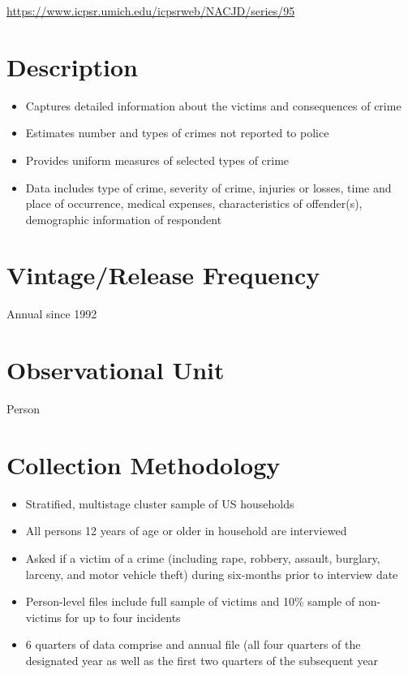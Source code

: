 \documentclass[
]{book}
\providecommand{\tightlist}{%
  \setlength{\itemsep}{0pt}\setlength{\parskip}{0pt}}
\begin{document}
\url{https://www.icpsr.umich.edu/icpsrweb/NACJD/series/95}

\hypertarget{description-46}{%
\section{Description}\label{description-46}}

\begin{itemize}
\tightlist
\item
  Captures detailed information about the victims and consequences of crime
\item
  Estimates number and types of crimes not reported to police
\item
  Provides uniform measures of selected types of crime
\item
  Data includes type of crime, severity of crime, injuries or losses, time and place of occurrence, medical expenses, characteristics of offender(s), demographic information of respondent
\end{itemize}

\hypertarget{vintagerelease-frequency-46}{%
\section{Vintage/Release Frequency}\label{vintagerelease-frequency-46}}

Annual since 1992

\hypertarget{observational-unit-46}{%
\section{Observational Unit}\label{observational-unit-46}}

Person

\hypertarget{collection-methodology-46}{%
\section{Collection Methodology}\label{collection-methodology-46}}

\begin{itemize}
\tightlist
\item
  Stratified, multistage cluster sample of US households
\item
  All persons 12 years of age or older in household are interviewed
\item
  Asked if a victim of a crime (including rape, robbery, assault, burglary, larceny, and motor vehicle theft) during six-months prior to interview date
\item
  Person-level files include full sample of victims and 10\% sample of non-victims for up to four incidents
\item
  6 quarters of data comprise and annual file (all four quarters of the designated year as well as the first two quarters of the subsequent year
\end{itemize}
\end{document}
